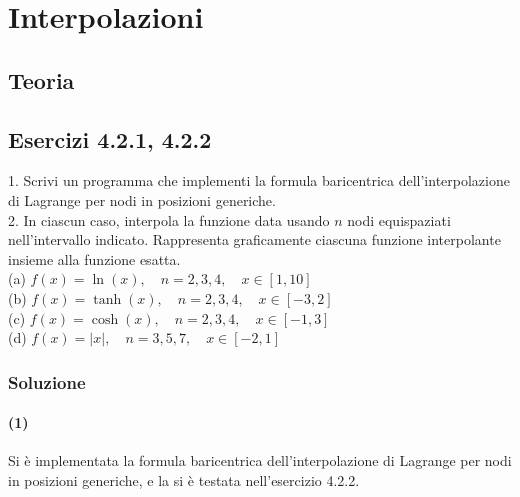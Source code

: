 \documentclass[letterpaper, 12pt]{article}
\begin{document}
\section{Interpolazioni}
\subsection{Teoria}


\subsection{Esercizi 4.2.1, 4.2.2}
1. Scrivi un programma che implementi la formula baricentrica dell'interpolazione di Lagrange 
    per nodi in posizioni generiche. \\
2. In ciascun caso, interpola la funzione data usando $n$ nodi equispaziati nell'intervallo indicato.
    Rappresenta graficamente ciascuna funzione interpolante insieme alla funzione esatta. \\
(a) $f(x) = \ln (x), \quad n = 2,3,4, \quad x\in [1,10]$ \\ 
(b) $f(x) = \tanh (x), \quad n = 2,3,4, \quad x \in [-3,2]$ \\
(c) $f(x) = \cosh (x), \quad n = 2,3,4, \quad x \in [-1,3]$ \\
(d) $f(x) = |x|, \quad n = 3,5,7, \quad x \in [-2,1]$ \\

\subsubsection{Soluzione}
\paragraph{(1) } Si è implementata la formula baricentrica dell'interpolazione di Lagrange 
per nodi in posizioni generiche, e la si è testata nell'esercizio 4.2.2.
\end{document}
